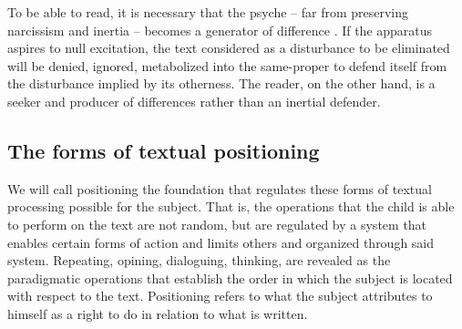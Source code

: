 \documentclass[english]{textolivre}
\begin{document}
To be able to read, it is necessary that the psyche – far from preserving narcissism and inertia – becomes a generator of difference \cite{derrida_gramatologi_1967}.  If the apparatus aspires to null excitation, the text considered as a disturbance to be eliminated will be denied, ignored, metabolized into the same-proper to defend itself from the disturbance implied by its otherness. The reader, on the other hand, is a seeker and producer of differences rather than an inertial defender.

\subsection{The forms of textual positioning}\label{sec-formato}
We will call positioning the foundation that regulates these forms of textual processing possible for the subject. That is, the operations that the child is able to perform on the text are not random, but are regulated by a system that enables certain forms of action and limits others and organized through said system. Repeating, opining, dialoguing, thinking, are revealed as the paradigmatic operations that establish the order in which the subject is located with respect to the text.  Positioning refers to what the subject attributes to himself as a right to do in relation to what is written.
\end{document}
